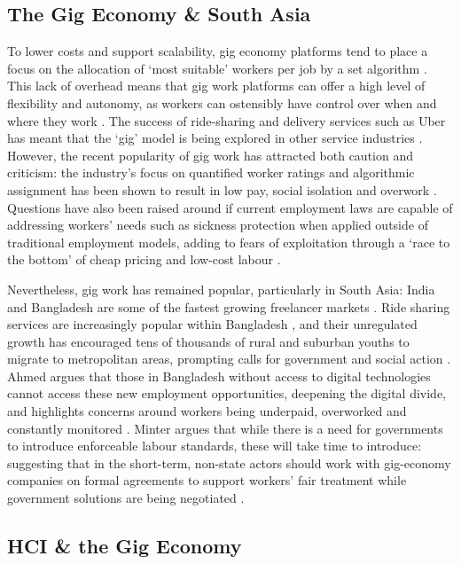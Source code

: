 \subsection{The Gig Economy \& South Asia}

To lower costs and support scalability, gig economy platforms tend to place a focus on the allocation of `most suitable' workers per job by a set algorithm \cite{Wood2019}. This lack of overhead means that gig work platforms can offer a high level of flexibility and autonomy, as workers can ostensibly have control over when and where they work \cite{Wood2019, Balaram2017, carlos2021}. The success of ride-sharing and delivery services such as Uber has meant that the `gig' model is being explored in other service industries \cite{Balaram2017}. However, the recent popularity of gig work has attracted both caution and criticism: the industry's focus on quantified worker ratings and algorithmic assignment has been shown to result in low pay, social isolation and overwork \cite{Wood2019}. Questions have also been raised around if current employment laws are capable of addressing workers' needs such as sickness protection when applied outside of traditional employment models, adding to fears of exploitation through a `race to the bottom' of cheap pricing and low-cost labour \cite{Taylor2017,Balaram2017}. 

Nevertheless, gig work has remained popular, particularly in South Asia: India and Bangladesh are some of the fastest growing freelancer markets \cite{Payoneer2019}. Ride sharing services are increasingly popular within Bangladesh \cite{islam2019}, and their unregulated growth has encouraged tens of thousands of rural and suburban youths to migrate to metropolitan areas, prompting calls for government and social action \cite{Fairwork2021}. Ahmed argues that those in Bangladesh without access to digital technologies cannot access these new employment opportunities, deepening the digital divide, and highlights concerns around workers being underpaid, overworked and constantly monitored \cite{Ahmed2020, Irani2013}. Minter argues that while there is a need for governments to introduce enforceable labour standards, these will take time to introduce: suggesting that in the short-term, non-state actors should work with gig-economy companies on formal agreements to support workers' fair treatment while government solutions are being negotiated \cite{Minter2017}.


\subsection{HCI \& the Gig Economy }

